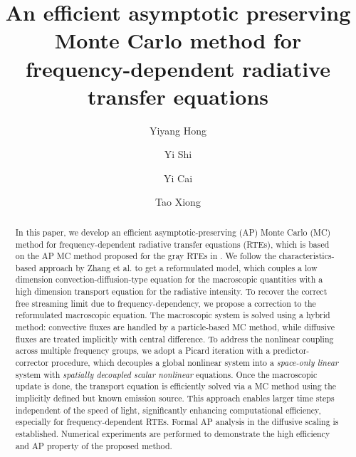 \documentclass[preprint,12pt]{elsarticle}
\theoremstyle{definition}
\theoremstyle{plain}
\numberwithin{equation}{section}
\numberwithin{algorithm}{section}
\newcounter{eq_count}
\newcounter{tab_count}
\begin{document}
\begin{frontmatter}

    \title{An efficient asymptotic preserving Monte Carlo
method for frequency-dependent radiative transfer equations}
     \author[1]{Yiyang Hong}

      \author[2]{Yi Shi}

      \author[1]{Yi Cai}

     \author[3]{Tao Xiong}

     \address[1]{School of Mathematical Sciences, Xiamen University, Xiamen, Fujian 361005, PR China}

      \address[2]{School of Mathematics, Shandong University, Jinan, Shandong 250100, PR China}
    
     \address[3]{School of Mathematical Sciences, University of Science and Technology of China, Hefei, Anhui 230026, PR China}



    \begin{abstract}
        In this paper, we develop an efficient asymptotic-preserving (AP) Monte Carlo (MC) method for frequency-dependent radiative transfer equations (RTEs), which is based on the AP MC method proposed for the gray RTEs in \cite{shi2023efficient}. We follow the characteristics-based approach by Zhang et al. \cite{zhang2023asymptotic} to get a reformulated model, which couples a low dimension convection-diffusion-type equation for the macroscopic quantities with a high dimension transport equation for the radiative intensity. To recover the correct free streaming limit due to frequency-dependency, we propose a correction to the reformulated macroscopic equation. The macroscopic system is solved using a hybrid method: convective fluxes are handled by a particle-based MC method, while diffusive fluxes are treated implicitly with central difference. 
        To address the nonlinear coupling across multiple frequency groups, we adopt a Picard iteration with a predictor-corrector procedure, which decouples a global nonlinear system into a \textit{space-only linear}  system with \textit{spatially decoupled scalar nonlinear}  equations. Once the macroscopic update is done, the transport equation is efficiently solved via a MC  method using the implicitly defined but known emission source. This approach enables larger time steps independent of the speed of light, significantly enhancing computational efficiency, especially for frequency-dependent RTEs. Formal AP analysis in the diffusive scaling is established.  Numerical experiments are performed to demonstrate the high efficiency and AP property of the proposed method.




\end{abstract}
\end{frontmatter}
\end{document}
